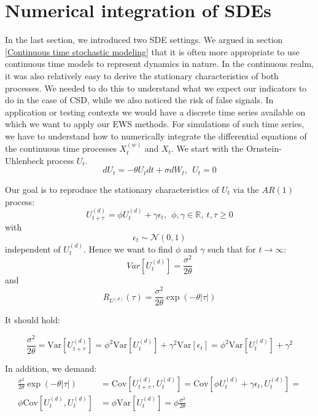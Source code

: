 \documentclass[%
thesis=student,%
coverpage=false,%
titlepage=false,%
headmarks=true, %
english,%
font=libertine, %
math=newpxtx, %
BCOR=5mm,%
coverBCOR=11mm%
]{tumbook}
\begin{document}
\chapter{Numerical integration of SDEs}

In the last section, we introduced two SDE settings. We argued in section \ref{Continuous time stochastic modeling} that it is often more appropriate to use continuous time models to represent dynamics in nature. In the continuous realm, it was also relatively easy to derive the stationary characteristics of both processes. We needed to do this to understand what we expect our indicators to do in the case of CSD, while we also noticed the risk of false signals. 
In application or testing contexts we would have a discrete time series available on which we want to apply our EWS methods. For simulations of such time series, we have to understand how to numerically integrate the differential equations of the continuous time processes $X_{t}^{(w)}$ and $X_{t}$. We start with the Ornstein-Uhlenbeck process $U_{t}$.
\[
dU_{t} = -\theta U_{t}dt + \sigma dW_{t}, \ \ U_{t} = 0
\]

Our goal is to reproduce the stationary characteristics of $U_{t}$  via the $AR(1)$ process:
\[
     U_{t+\tau}^{(d)} = \phi U_{t} ^{(d)}+ \gamma \epsilon_{t}, \ \ \phi, \gamma \in \mathbb{R}, \ t,\tau \geq 0
\]
with 
\[
\epsilon_{t} \sim \mathcal{N}(0,1)
\]
independent of $U_{t}^{(d)}$.
Hence we want to find $\phi$ and $\gamma$ such that for $t \rightarrow \infty$:
\[
Var[U_{t}^{(d)}] = \frac{\sigma^{2}}{2\theta}
\]
and 
\[
R_{U^{(d)}}(\tau) = \frac{\sigma ^2}{2\theta}\exp(-\theta\lvert \tau \rvert)
\]

It should hold:

\begin{equation*}
    \frac{\sigma^2}{2\theta} = \text{Var}[U_{t+\tau} ^{(d)}] = \phi ^2 \text{Var}[U_{t} ^{(d)}] + \gamma ^2 \text{Var}[\epsilon_{t}] = \phi ^2 \text{Var}[U_{t} ^{(d)}] + \gamma ^2
\end{equation*}

In addition, we demand: 
  \begin{align*} 
      \frac{\sigma ^2}{2\theta}\exp(-\theta\lvert \tau \rvert) &= \text{Cov}[U_{t+\tau} ^{(d)},U_{t} ^{(d)}] = \text{Cov}[\phi U_{t} ^{(d)} + \gamma \epsilon_{t}, U_{t}^{(d)}] = \\
      \phi\text{Cov}[U_{t}^{(d)},U_{t}^{(d)}] &= \phi \text{Var}[U_{t}^{(d)}] = \phi \frac{\sigma^2}{2\theta}
  \end{align*}
\end{document}
